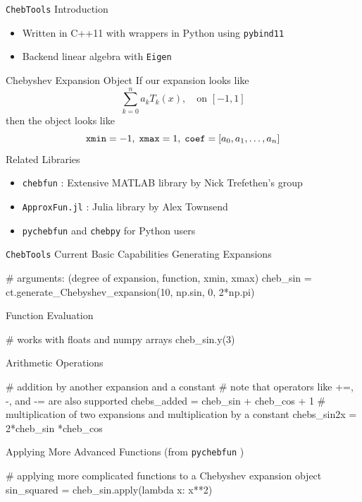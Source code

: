 \documentclass[final]{beamer}
\begin{document}
\begin{frame}[fragile]{}
\begin{columns}[t]
\begin{column}{.31\linewidth}
\begin{block}{{\tt ChebTools} Introduction}
\begin{itemize}
\item Written in C++11 with wrappers in Python using {\tt pybind11} \cite{pybind11}
\item Backend linear algebra with {\tt Eigen} \cite{eigen}						%
\end{itemize}
{\color{numhypRed} Chebyshev Expansion Object}
If our expansion looks like 
$$\sum_{k=0}^{n}a_kT_k(x), \quad \text{on $[-1, 1]$}$$ 
then the object looks like
$$ {\tt xmin} = -1, \; {\tt xmax} = 1, \; {\tt coef} = [a_0, a_1, \ldots, a_n]$$
{\color{numhypRed} Related Libraries}
\begin{itemize}
\item {\tt chebfun} \cite{driscoll_2014}: Extensive MATLAB library by Nick Trefethen's group
\item {\tt ApproxFun.jl} \cite{approxfun}: Julia library by Alex Townsend
\item {\tt pychebfun}\cite{pychebfun} and {\tt chebpy}\cite{chebpy} for Python users
\end{itemize}

\end{block}

\begin{block}{{\tt ChebTools} Current Basic Capabilities}
{\color{numhypRed} Generating Expansions}\\
\begin{python}
# arguments: (degree of expansion, function, xmin, xmax)
cheb_sin = ct.generate_Chebyshev_expansion(10, np.sin, 0, 2*np.pi)
\end{python}
{\color{numhypRed} Function Evaluation}\\
\begin{python}
# works with floats and numpy arrays
cheb_sin.y(3)
\end{python}
{\color{numhypRed} Arithmetic Operations}\\
\begin{python}
# addition by another expansion and a constant
# note that operators like +=, -, and -= are also supported
chebs_added = cheb_sin + cheb_cos + 1
# multiplication of two expansions and multiplication by a constant
chebs_sin2x = 2*cheb_sin *cheb_cos
\end{python}
{\color{numhypRed} Applying More Advanced Functions (from {\tt pychebfun} \cite{pychebfun})}\\
\begin{python}
# applying more complicated functions to a Chebyshev expansion object
sin_squared = cheb_sin.apply(lambda x: x**2)
\end{python}\end{block}
\end{column}



\end{columns}
\end{frame}
\end{document}
